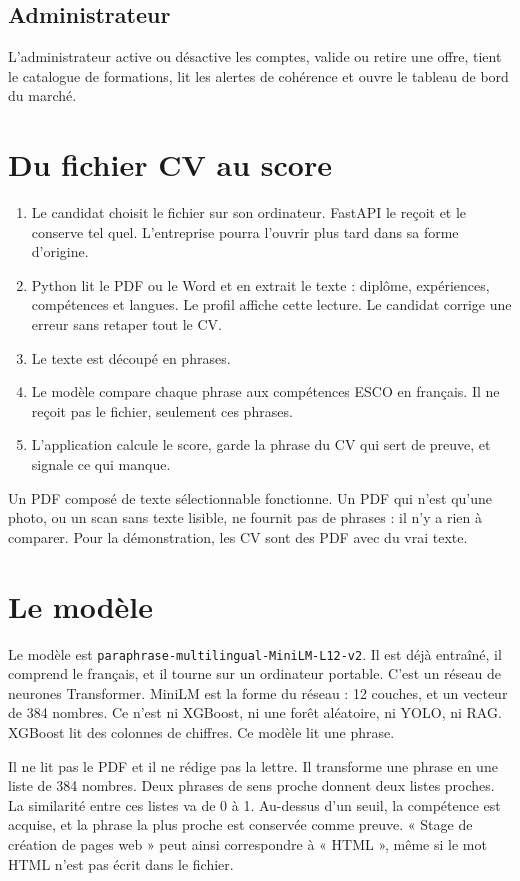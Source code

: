 \documentclass[11pt,a4paper]{article}
\begin{document}
\subsection{Administrateur}
L'administrateur active ou désactive les comptes, valide ou retire une offre, tient le catalogue de formations, lit les alertes de cohérence et ouvre le tableau de bord du marché.

\section{Du fichier CV au score}

\begin{enumerate}
  \item Le candidat choisit le fichier sur son ordinateur. FastAPI le reçoit et le conserve tel quel. L'entreprise pourra l'ouvrir plus tard dans sa forme d'origine.
  \item Python lit le PDF ou le Word et en extrait le texte : diplôme, expériences, compétences et langues. Le profil affiche cette lecture. Le candidat corrige une erreur sans retaper tout le CV.
  \item Le texte est découpé en phrases.
  \item Le modèle compare chaque phrase aux compétences ESCO en français. Il ne reçoit pas le fichier, seulement ces phrases.
  \item L'application calcule le score, garde la phrase du CV qui sert de preuve, et signale ce qui manque.
\end{enumerate}

Un PDF composé de texte sélectionnable fonctionne. Un PDF qui n'est qu'une photo, ou un scan sans texte lisible, ne fournit pas de phrases : il n'y a rien à comparer. Pour la démonstration, les CV sont des PDF avec du vrai texte.

\section{Le modèle}

Le modèle est \texttt{paraphrase-multilingual-MiniLM-L12-v2}. Il est déjà entraîné, il comprend le français, et il tourne sur un ordinateur portable. C'est un réseau de neurones Transformer. MiniLM est la forme du réseau : 12 couches, et un vecteur de 384 nombres. Ce n'est ni XGBoost, ni une forêt aléatoire, ni YOLO, ni RAG. XGBoost lit des colonnes de chiffres. Ce modèle lit une phrase.

Il ne lit pas le PDF et il ne rédige pas la lettre. Il transforme une phrase en une liste de 384 nombres. Deux phrases de sens proche donnent deux listes proches. La similarité entre ces listes va de 0 à 1. Au-dessus d'un seuil, la compétence est acquise, et la phrase la plus proche est conservée comme preuve. « Stage de création de pages web » peut ainsi correspondre à « HTML », même si le mot HTML n'est pas écrit dans le fichier.
\end{document}
